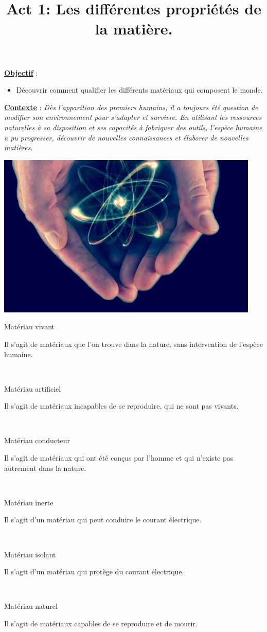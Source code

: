 \documentclass[10pt]{article}
\newcommand{\titreActivite}{\huge Act 1: Les différentes propriétés de la matière.} %
\newcommand{\objectif}{ 	
	
	\begin{itemize}
		\item Découvrir comment qualifier les différents matériaux qui composent le monde.
	\end{itemize}
} %
\newcommand{\contexte}{
	Dès l'apparition des premiers humains, il a toujours été question de modifier son
	environnement pour s’adapter et survivre.
	En utilisant les ressources naturelles à sa disposition et ses capacités à fabriquer des outils, l’espèce
	humaine a pu progresser, découvrir de nouvelles connaissances et élaborer de nouvelles matières.
}
\newcommand{\bullets}[2]{ 
	\begin{minipage}{3.75cm}
		#1
	\end{minipage}
	\begin{minipage}{0.1in}
		\bullet
	\end{minipage}
	\hfill
	\begin{minipage}{0.1in}
		\bullet
	\end{minipage}
	\begin{minipage}{10cm}
		#2
	\end{minipage}
	\vspace{10pt}\\
	}
\begin{document}
\date{}
\title{\titreActivite}
\maketitle %


\underline{\textbf{Objectif}} :  \vspace{2pt}
\objectif

\vspace{4pt}

\underline{\textbf{Contexte}} :  \textit{\contexte}

\begin{center}
	\includegraphics[width=0.55\columnwidth]{activité.jpg} %
\end{center}

\vspace{-12pt}



\begin{question}
\end{question} \vspace{10pt}

	\bullets{Matériau vivant}{Il s’agit de matériaux que l’on trouve dans la nature, sans intervention de l’espèce humaine. }
	\bullets{Matériau artificiel}{Il s’agit de matériaux incapables de se reproduire, qui ne sont pas vivants. }
	\bullets{Matériau conducteur}{Il s’agit de matériaux qui ont été conçus par l’homme et qui n’existe pas autrement dans la nature.}
	\bullets{Matériau inerte}{Il s’agit d’un matériau qui peut conduire le courant électrique.}
	\bullets{Matériau isolant}{Il s’agit d’un matériau qui protège du courant électrique.}
	\bullets{Matériau naturel}{Il s’agit de matériaux capables de se reproduire et de mourir.}
\end{document}
